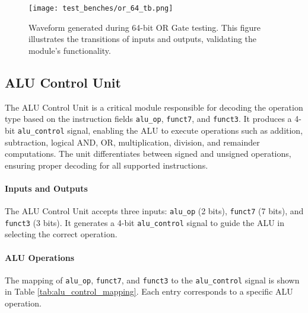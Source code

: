 \documentclass[12pt]{article}
\begin{document}
\begin{figure}[ht!]
    \centering
    \texttt{[image: test\_benches/or\_64\_tb.png]}
    \caption{Waveform generated during 64-bit OR Gate testing. This figure illustrates the transitions of inputs and outputs, validating the module's functionality.}
    \label{fig:or_gate_waveform}
\end{figure}

\subsection*{ALU Control Unit}

The ALU Control Unit is a critical module responsible for decoding the operation type based on the instruction fields \texttt{alu\_op}, \texttt{funct7}, and \texttt{funct3}. It produces a 4-bit \texttt{alu\_control} signal, enabling the ALU to execute operations such as addition, subtraction, logical AND, OR, multiplication, division, and remainder computations. The unit differentiates between signed and unsigned operations, ensuring proper decoding for all supported instructions.

\paragraph{Inputs and Outputs}
The ALU Control Unit accepts three inputs: \texttt{alu\_op} (2 bits), \texttt{funct7} (7 bits), and \texttt{funct3} (3 bits). It generates a 4-bit \texttt{alu\_control} signal to guide the ALU in selecting the correct operation.

\paragraph{ALU Operations}
The mapping of \texttt{alu\_op}, \texttt{funct7}, and \texttt{funct3} to the \texttt{alu\_control} signal is shown in Table \ref{tab:alu_control_mapping}. Each entry corresponds to a specific ALU operation.
\end{document}
